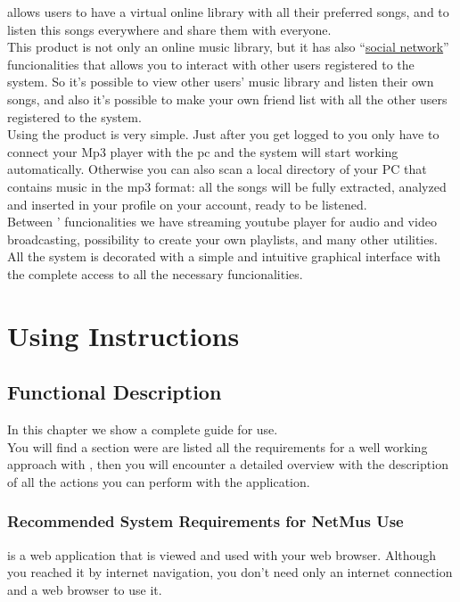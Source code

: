  allows users to have a virtual online library with all their
preferred songs, and to listen this songs everywhere and share them with
everyone.\\

This product is not only an online music library, but it has also
``\underline{social network}'' funcionalities that allows you to interact with other users
registered to the system. So it's possible to view other users' music library
and listen their own songs, and also it's possible to make your own friend list
with all the other users registered to the system.\\

Using the product is very simple. Just after you get logged to  you
only have to connect your Mp3 player with the pc and the system will start
working automatically. Otherwise you can also scan a local directory of your PC
that contains music in the mp3 format: all the songs will be fully extracted,
analyzed and inserted in your profile on your  account, ready to be
listened.\\

Between ' funcionalities we have streaming youtube player for audio
and video broadcasting, possibility to create your own playlists, and many other
utilities.\\

All the system is decorated with a simple and intuitive graphical interface
with the complete access to all the necessary funcionalities.\\


\chapter{Using Instructions}
\thispagestyle{fancy}

\section{Functional Description}
In this chapter we show a complete guide for  use.\\
You will find a section were are listed all the requirements for a well
working approach with , then you will encounter a detailed overview
with the description of all the actions you can perform with the
application.

\subsection{Recommended System Requirements for NetMus Use}
 is a web application that is viewed and used with your web browser.
Although you reached it by internet navigation, you don't need only an internet
connection and a web browser to use it.\\

